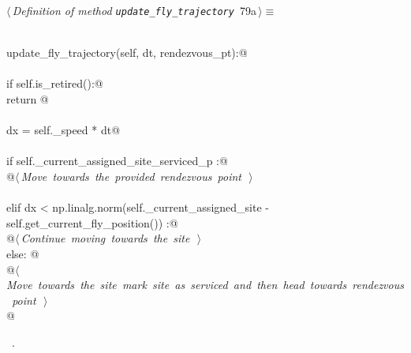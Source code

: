 \documentclass[11.5pt]{report}
\begin{document}
\begin{flushleft} \small
\begin{minipage}{\linewidth}\label{scrap120}\raggedright\small
{} $\langle\,${\itshape Definition of method \verb|update_fly_trajectory|}\nobreak\ {\footnotesize {79a}}$\,\rangle\equiv$
\vspace{-1ex}
\begin{list}{}{} \item
\mbox{}\verb@@\\
\mbox{}\verb@def update_fly_trajectory(self, dt, rendezvous_pt):@\\
\mbox{}\verb@@\\
\mbox{}\verb@     if self.is_retired():@\\
\mbox{}\verb@        return @\\
\mbox{}\verb@@\\
\mbox{}\verb@     dx = self._speed * dt@\\
\mbox{}\verb@@\\
\mbox{}\verb@     if self._current_assigned_site_serviced_p :@\\
\mbox{}\verb@        @\hbox{$\langle\,${\itshape Move towards the provided rendezvous point}\nobreak\ {\footnotesize {}}$\,\rangle$}\verb@@\\
\mbox{}\verb@@\\
\mbox{}\verb@     elif dx < np.linalg.norm(self._current_assigned_site - self.get_current_fly_position()) :@\\
\mbox{}\verb@        @\hbox{$\langle\,${\itshape Continue moving towards the site}\nobreak\ {\footnotesize {}}$\,\rangle$}\verb@@\\
\mbox{}\verb@     else: @\\
\mbox{}\verb@        @\hbox{$\langle\,${\itshape Move towards the site mark site as serviced and then head towards rendezvous point}\nobreak\ {\footnotesize {}}$\,\rangle$}\verb@@\\
\mbox{}\verb@ @{\NWsep}
\end{list}
\vspace{-1.5ex}
\footnotesize
\begin{list}{}{\setlength{\itemsep}{-\parsep}\setlength{\itemindent}{-\leftmargin}}
\item \NWtxtMacroRefIn\ .

\item{}
\end{list}
\end{minipage}\vspace{4ex}
\end{flushleft}
\end{document}
